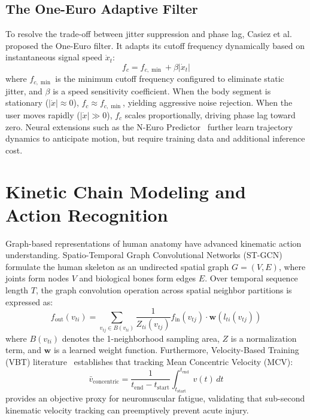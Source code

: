 \documentclass[12pt]{report}
\begin{document}
\subsection{The One-Euro Adaptive Filter}
To resolve the trade-off between jitter suppression and phase lag, Casiez et al.~\cite{casiez2012euro} proposed the One-Euro filter. It adapts its cutoff frequency dynamically based on instantaneous signal speed $\dot{x}_t$:
\begin{equation}
    f_c = f_{c,\min} + \beta |\dot{x}_t|
\end{equation}
where $f_{c,\min}$ is the minimum cutoff frequency configured to eliminate static jitter, and $\beta$ is a speed sensitivity coefficient. When the body segment is stationary ($|\dot{x}| \approx 0$), $f_c \approx f_{c,\min}$, yielding aggressive noise rejection. When the user moves rapidly ($|\dot{x}| \gg 0$), $f_c$ scales proportionally, driving phase lag toward zero. Neural extensions such as the N-Euro Predictor~\cite{shao2023neuro} further learn trajectory dynamics to anticipate motion, but require training data and additional inference cost.

\section{Kinetic Chain Modeling and Action Recognition}
Graph-based representations of human anatomy have advanced kinematic action understanding. Spatio-Temporal Graph Convolutional Networks (ST-GCN)~\cite{yan2018spatial, li2018stgcn} formulate the human skeleton as an undirected spatial graph $G = (V, E)$, where joints form nodes $V$ and biological bones form edges $E$. Over temporal sequence length $T$, the graph convolution operation across spatial neighbor partitions is expressed as:
\begin{equation}
    f_{\text{out}}(v_{ti}) = \sum_{v_{tj} \in B(v_{ti})} \frac{1}{Z_{ti}(v_{tj})} f_{\text{in}}(v_{tj}) \cdot \mathbf{w}(l_{ti}(v_{tj}))
\end{equation}
where $B(v_{ti})$ denotes the 1-neighborhood sampling area, $Z$ is a normalization term, and $\mathbf{w}$ is a learned weight function. Furthermore, Velocity-Based Training (VBT) literature~\cite{sanchez2011velocity} establishes that tracking Mean Concentric Velocity (MCV):
\begin{equation}
    \bar{v}_{\text{concentric}} = \frac{1}{t_{\text{end}} - t_{\text{start}}} \int_{t_{\text{start}}}^{t_{\text{end}}} v(t)\,dt
\end{equation}
provides an objective proxy for neuromuscular fatigue, validating that sub-second kinematic velocity tracking can preemptively prevent acute injury.
\end{document}

